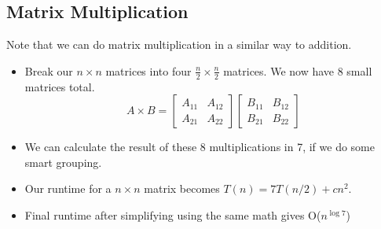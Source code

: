 \documentclass[10pt]{article}
\begin{document}
\subsection*{Matrix Multiplication}
Note that we can do matrix multiplication in a similar way to addition.
\begin{itemize}
	\item Break our $n \times n$ matrices into four $\frac{n}{2} \times \frac{n}{2}$ matrices.  We now have 8 small matrices total.
	\[A \times B = \begin{bmatrix} A_{11} & A_{12} \\ A_{21} & A_{22} \end{bmatrix} \begin{bmatrix} B_{11} & B_{12} \\ B_{21} & B_{22} \end{bmatrix}\]
    \item We can calculate the result of these 8 multiplications in 7, if we do some smart grouping.
    \item Our runtime for a $n \times n$ matrix becomes $T(n) = 7 T(n / 2) + c n^2$.
    \item Final runtime after simplifying using the same math gives O($n^{\log 7}$)
\end{itemize}
\end{document}
